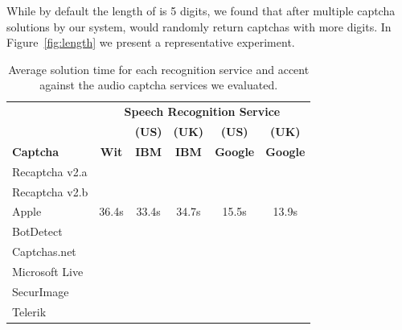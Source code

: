 While by default the length of \re is 5 digits, we found that after multiple captcha solutions by our system,
\re would randomly return captchas with more digits. In Figure~\ref{fig:length} we present a representative experiment.

\begin{table}[t]
\centering
\caption{Average solution time for each recognition service and accent against the audio captcha services we evaluated.}
\begin{tabular}{lccccc}
\toprule
&\multicolumn{5}{c}{\textbf{Speech Recognition Service}}\\
\cmidrule{2-6}
& & \textbf{(US)} & \textbf{(UK)} & \textbf{(US)} & \textbf{(UK)} \\
\textbf{Captcha}&  \textbf{Wit} & \textbf{IBM} & \textbf{IBM} & \textbf{Google} & \textbf{Google} \\
\hline
Recaptcha v2.a &  &  & & & \\
\rowcolor{Gray}
Recaptcha v2.b &  &  &  & & \\
Apple  & 36.4s & 33.4s  & 34.7s & 15.5s & 13.9s \\
\rowcolor{Gray}
BotDetect  &  & &  & & \\
Captchas.net  &  &  &  & & \\
\rowcolor{Gray}
Microsoft Live & &  &  & & \\
SecurImage  &  & &  & & \\
\rowcolor{Gray}
Telerik  & & & & & \\
\bottomrule
\end{tabular}
\label{tab:solution_time}
\end{table}





